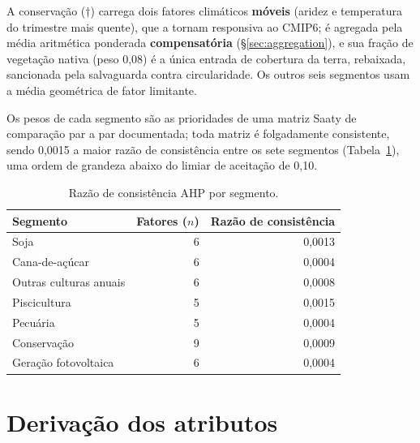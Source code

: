 A conservação ($\dagger$) carrega dois fatores climáticos \textbf{móveis} (aridez e
temperatura do trimestre mais quente), que a tornam responsiva ao CMIP6; é agregada pela
média aritmética ponderada \textbf{compensatória} (\S\ref{sec:aggregation}), e sua fração de
vegetação nativa (peso 0,08) é a única entrada de cobertura da terra, rebaixada, sancionada
pela salvaguarda contra circularidade. Os outros seis segmentos usam a média geométrica de
fator limitante.

Os pesos de cada segmento são as prioridades de uma matriz Saaty de comparação par a par
documentada; toda matriz é folgadamente consistente, sendo 0,0015 a maior razão de
consistência entre os sete segmentos (Tabela~\ref{tab:ahp-cr}), uma ordem de grandeza abaixo
do limiar de aceitação de 0,10.

\begin{table}[H]
\centering
\caption{Razão de consistência AHP por segmento.}
\label{tab:ahp-cr}
\begin{tabular}{@{}lrr@{}}
\toprule
Segmento & Fatores ($n$) & Razão de consistência \\
\midrule
Soja                 & 6 & 0,0013 \\
Cana-de-açúcar       & 6 & 0,0004 \\
Outras culturas anuais & 6 & 0,0008 \\
Piscicultura         & 5 & 0,0015 \\
Pecuária             & 5 & 0,0004 \\
Conservação          & 9 & 0,0009 \\
Geração fotovoltaica & 6 & 0,0004 \\
\bottomrule
\end{tabular}
\end{table}

\chapter{Derivação dos atributos}\label{anx:derivations}

